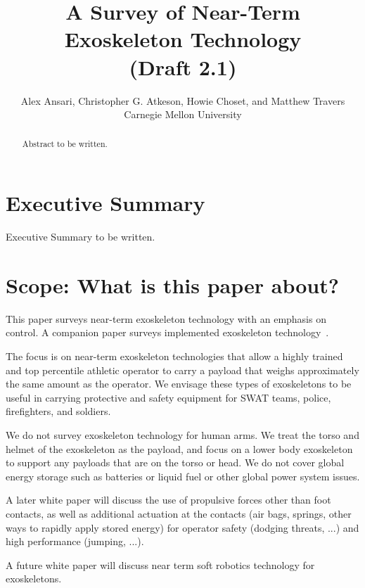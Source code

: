 \documentclass[letterpaper,12pt,fullpage]{article}
\begin{document}
\title{A Survey of Near-Term Exoskeleton Technology\\
(Draft 2.1)}

\author{Alex Ansari, Christopher G. Atkeson, Howie Choset, and Matthew Travers\\
Carnegie Mellon University}

\maketitle

\begin{abstract}
Abstract to be written.
\end{abstract}

\section{Executive Summary}

Executive Summary to be written.

\section{Scope: What is this paper about?}

This paper surveys near-term exoskeleton technology with an
emphasis on control.
A companion paper surveys implemented exoskeleton technology~\cite{}.

The focus is on near-term exoskeleton technologies that allow a
highly trained and top percentile athletic 
operator to carry a payload that weighs approximately the same amount
as the operator. We envisage these types of exoskeletons to be useful
in carrying protective and safety equipment for SWAT teams, police,
firefighters, and soldiers. 

We do not survey exoskeleton technology for human arms. 
We treat the torso and helmet of the exoskeleton as the payload,
and focus on a lower body exoskeleton to support any payloads that
are on the torso or head.
We do not cover global energy storage such as batteries or liquid fuel
or other global power system issues.

A later white paper will discuss the use of propulsive forces other
than foot contacts, as well as additional actuation at the contacts (air
bags, springs, other ways to rapidly apply stored energy) for
operator safety (dodging threats, ...) and high performance (jumping, ...).

A future white paper will discuss near term soft robotics technology
for exoskeletons.
\end{document}
